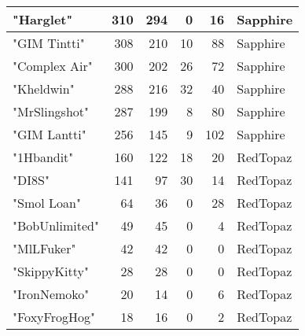\documentclass{article}
\begin{document}
\begin{table}[htbp]
\begin{tabular}{|l|r|r|r|r|l|}
"Harglet" & 310 & 294 & 0 & 16 & Sapphire \\ \hline
"GIM Tintti" & 308 & 210 & 10 & 88 & Sapphire \\ \hline
"Complex Air" & 300 & 202 & 26 & 72 & Sapphire \\ \hline
"Kheldwin" & 288 & 216 & 32 & 40 & Sapphire \\ \hline
"MrSlingshot" & 287 & 199 & 8 & 80 & Sapphire \\ \hline
"GIM Lantti" & 256 & 145 & 9 & 102 & Sapphire \\ \hline
"1Hbandit" & 160 & 122 & 18 & 20 & RedTopaz \\ \hline
"DI8S" & 141 & 97 & 30 & 14 & RedTopaz \\ \hline
"Smol Loan" & 64 & 36 & 0 & 28 & RedTopaz \\ \hline
"BobUnlimited" & 49 & 45 & 0 & 4 & RedTopaz \\ \hline
"MlLFuker" & 42 & 42 & 0 & 0 & RedTopaz \\ \hline
"SkippyKitty" & 28 & 28 & 0 & 0 & RedTopaz \\ \hline
"IronNemoko" & 20 & 14 & 0 & 6 & RedTopaz \\ \hline
"FoxyFrogHog" & 18 & 16 & 0 & 2 & RedTopaz \\ \hline
\end{tabular}
\end{table}
\end{document}
